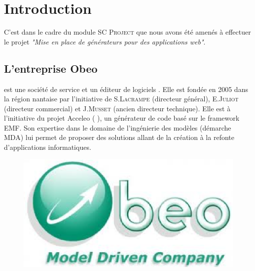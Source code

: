 \chapter{Introduction}\label{chap:Intro}
C'est dans le cadre du module \textsc{SC Project} que nous avons été amenés à effectuer le projet \textit{"Mise en place de générateurs pour des applications web"}. 


\section{L'entreprise Obeo}
\kwobeo{} est une société de service et un éditeur de logiciels \cite{obeo}.  Elle est fondée en 2005 dans la région nantaise par l'initiative de S.\textsc{Lacrampe} (directeur général), E.\textsc{Juliot} (directeur commercial) et J.\textsc{Musset} (ancien directeur technique). Elle est à l'initiative du projet Acceleo (\cf{} \cite{acceleo}), un générateur de code basé sur le framework EMF. Son expertise dans le domaine de l'ingénierie des modèles (démarche MDA) lui permet de proposer des solutions allant de la création à la refonte d'applications informatiques. 

\begin{figure}[htb]
  \centering
  \includegraphics[scale=.4]{img/logoobeo.eps}
  \label{fig:obeo}
\end{figure}

